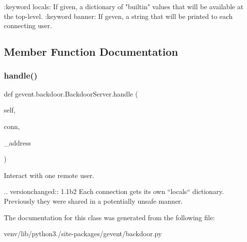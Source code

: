 \begin{DoxyVerb}:keyword locals: If given, a dictionary of "builtin" values that will be available
    at the top-level.
:keyword banner: If geven, a string that will be printed to each connecting user.
\end{DoxyVerb}
 

\subsection{Member Function Documentation}
\mbox{\label{classgevent_1_1backdoor_1_1_backdoor_server_a1ca7d2ccfd6c400605ebb1e1038bcede}} 
\subsubsection{\texorpdfstring{handle()}{handle()}}
{\footnotesize\ttfamily def gevent.\+backdoor.\+Backdoor\+Server.\+handle (\begin{DoxyParamCaption}\item[{}]{self,  }\item[{}]{conn,  }\item[{}]{\+\_\+address }\end{DoxyParamCaption})}

\begin{DoxyVerb}Interact with one remote user.

.. versionchanged:: 1.1b2 Each connection gets its own
    ``locals`` dictionary. Previously they were shared in a
    potentially unsafe manner.
\end{DoxyVerb}
 

The documentation for this class was generated from the following file\+:\begin{DoxyCompactItemize}
\item 
venv/lib/python3./site-\/packages/gevent/backdoor.\+py\end{DoxyCompactItemize}
